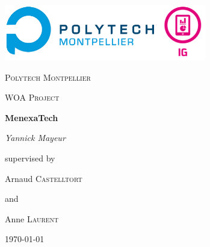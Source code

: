 \begin{titlepage}
	\centering
	\includegraphics[width=0.66\textwidth]{src/title_logo.png}\par\vspace{1cm}
	{\scshape\LARGE Polytech Montpellier\par}
	\vspace{1cm}
	{\scshape\Large WOA Project\par}
	\vspace{1.5cm}
	{\huge\bfseries MenexaTech\par}
	\vspace{2cm}
	{\Large\itshape Yannick Mayeur\par}
	\vfill
	supervised by\par
	Arnaud \textsc{Castelltort}\par
	and\par
	Anne \textsc{Laurent}

	\vfill

	{\large \today\par}
\end{titlepage}
